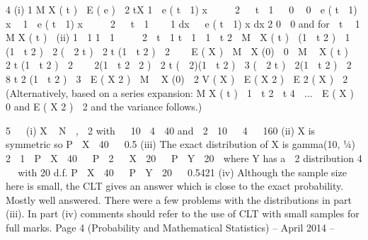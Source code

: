 \documentclass[a4paper,12pt]{article}
\begin{document}
4
(i)
1
M X ( t )  E ( e ) 
2
tX
1  e ( t  1) x 
 

2   t  1  
0

0
 e
( t  1) x

1  e ( t  1) x 
 

2   t  1  

1
dx   e ( t  1) x dx
2
0

0
and for  t  1
M X ( t ) 
(ii)
1  1
1 
1


 
2  t  1 t  1  1  t 2

M  X ( t )  (1  t 2 )  1   (1  t 2 )  2 (  2 t )  2 t (1  t 2 )  2


 E ( X )  M  X (0)  0

M  X ( t )  2 t (1  t 2 )  2

  2(1  t
2  2
)
 2 t (  2)(1  t 2 )  3 (  2 t )
 2(1  t 2 )  2  8 t 2 (1  t 2 )  3
 E ( X 2 )  M  X (0)  2
V ( X )  E ( X 2 )  E 2 ( X )  2
(Alternatively, based on a series expansion:
M X ( t )  1  t 2  t 4  ...  E ( X )  0 and E ( X 2 )  2 and the variance follows.)

5


(i) X ~ N  ,  2 with   10  4  40 and  2  10   4   160
(ii) X is symmetric so P  X  40   0.5
(iii) The exact distribution of X is gamma(10, 1⁄4)
2
 1

P  X  40   P  2   X  20   P  Y  20  where Y has a  2 distribution
4


with 20 d.f.
P  X  40   P  Y  20   0.5421
(iv)
Although the sample size here is small, the CLT gives an answer which is
close to the exact probability.
Mostly well answered. There were a few problems with the distributions in part (iii). In part
(iv) comments should refer to the use of CLT with small samples for full marks.
Page 4 (Probability and Mathematical Statistics) – April 2014 – 
\end{document}
